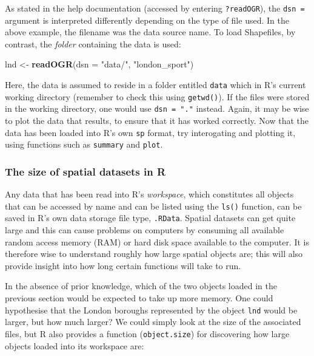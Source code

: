 \documentclass[]{article}
\newenvironment{Shaded}{}{}
\newcommand{\KeywordTok}[1]{\textcolor[rgb]{0.00,0.44,0.13}{\textbf{{#1}}}}
\newcommand{\DataTypeTok}[1]{\textcolor[rgb]{0.56,0.13,0.00}{{#1}}}
\newcommand{\StringTok}[1]{\textcolor[rgb]{0.25,0.44,0.63}{{#1}}}
\newcommand{\NormalTok}[1]{{#1}}
\begin{document}
As stated in the help documentation (accessed by entering
\texttt{?readOGR}), the \texttt{dsn =} argument is interpreted
differently depending on the type of file used. In the above example,
the filename was the data source name. To load Shapefiles, by contrast,
the \emph{folder} containing the data is used:

\begin{Shaded}
\begin{Highlighting}[]
\NormalTok{lnd <-}\StringTok{ }\KeywordTok{readOGR}\NormalTok{(}\DataTypeTok{dsn =} \StringTok{"data/"}\NormalTok{, }\StringTok{"london_sport"}\NormalTok{)}
\end{Highlighting}
\end{Shaded}

Here, the data is assumed to reside in a folder entitled \texttt{data}
which in R's current working directory (remember to check this using
\texttt{getwd()}). If the files were stored in the working directory,
one would use \texttt{dsn = "."} instead. Again, it may be wise to plot
the data that results, to ensure that it has worked correctly. Now that
the data has been loaded into R's own \texttt{sp} format, try
interogating and plotting it, using functions such as \texttt{summary}
and \texttt{plot}.

\subsubsection{The size of spatial datasets in R}

Any data that has been read into R's \emph{workspace}, which constitutes
all objects that can be accessed by name and can be listed using the
\texttt{ls()} function, can be saved in R's own data storage file type,
\texttt{.RData}. Spatial datasets can get quite large and this can cause
problems on computers by consuming all available random access memory
(RAM) or hard disk space available to the computer. It is therefore wise
to understand roughly how large spatial objects are; this will also
provide insight into how long certain functions will take to run.

In the absence of prior knowledge, which of the two objects loaded in
the previous section would be expected to take up more memory. One could
hypothesise that the London boroughs represented by the object
\texttt{lnd} would be larger, but how much larger? We could simply look
at the size of the associated files, but R also provides a function
(\texttt{object.size}) for discovering how large objects loaded into its
workspace are:
\end{document}

